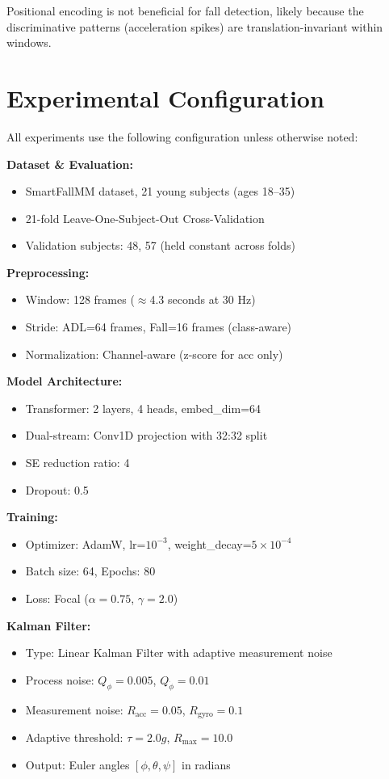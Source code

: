 Positional encoding is not beneficial for fall detection, likely because the discriminative patterns (acceleration spikes) are translation-invariant within windows.

\section{Experimental Configuration}
\label{app:config}

All experiments use the following configuration unless otherwise noted:

\textbf{Dataset \& Evaluation:}
\begin{itemize}
    \item SmartFallMM dataset, 21 young subjects (ages 18--35)
    \item 21-fold Leave-One-Subject-Out Cross-Validation
    \item Validation subjects: 48, 57 (held constant across folds)
\end{itemize}

\textbf{Preprocessing:}
\begin{itemize}
    \item Window: 128 frames ($\approx$4.3 seconds at 30 Hz)
    \item Stride: ADL=64 frames, Fall=16 frames (class-aware)
    \item Normalization: Channel-aware (z-score for acc only)
\end{itemize}

\textbf{Model Architecture:}
\begin{itemize}
    \item Transformer: 2 layers, 4 heads, embed\_dim=64
    \item Dual-stream: Conv1D projection with 32:32 split
    \item SE reduction ratio: 4
    \item Dropout: 0.5
\end{itemize}

\textbf{Training:}
\begin{itemize}
    \item Optimizer: AdamW, lr=$10^{-3}$, weight\_decay=$5\times10^{-4}$
    \item Batch size: 64, Epochs: 80
    \item Loss: Focal ($\alpha=0.75$, $\gamma=2.0$)
\end{itemize}

\textbf{Kalman Filter:}
\begin{itemize}
    \item Type: Linear Kalman Filter with adaptive measurement noise
    \item Process noise: $Q_\phi=0.005$, $Q_{\dot\phi}=0.01$
    \item Measurement noise: $R_\text{acc}=0.05$, $R_\text{gyro}=0.1$
    \item Adaptive threshold: $\tau=2.0g$, $R_\text{max}=10.0$
    \item Output: Euler angles $[\phi, \theta, \psi]$ in radians
\end{itemize}


